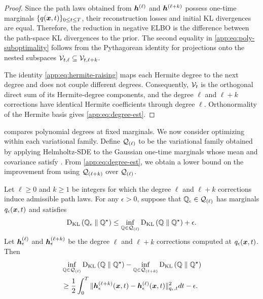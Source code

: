 \begin{proof}
Since the path laws obtained from $\boldsymbol{h}^{(\ell)}$ and $\boldsymbol{h}^{(\ell+k)}$ possess one-time marginals $\{q(\boldsymbol{x}, t)\}_{0 \leq t \leq T}$, their reconstruction losses and initial KL divergences are equal.
Therefore, the reduction in negative ELBO is the difference between the path-space KL divergences to the prior.
The second equality in \cref{app:eq:poly-suboptimality} follows from the Pythagorean identity for projections onto the nested subspaces $\mathcal{V}_{t,\ell}\subseteq\mathcal{V}_{t,\ell+k}$.

The identity \cref{app:eq:hermite-raising} maps each Hermite degree to the next degree and does not couple different degrees.
Consequently, $\mathcal{V}_t$ is the orthogonal direct sum of its Hermite-degree components, and the degree $\ell$ and $\ell+k$ corrections have identical Hermite coefficients through degree $\ell$.
Orthonormality of the Hermite basis gives \cref{app:eq:degree-est}.
\end{proof}

 compares polynomial degrees at fixed marginals. 
We now consider optimizing within each variational family.
Define $\mathcal{Q}_{(\ell)}$ to be the variational family obtained by applying Helmholtz-SDE to the Gaussian one-time marginals whose mean and covariance satisfy .
From \cref{app:eq:degree-est}, we obtain a lower bound on the improvement from using $\mathcal{Q}_{(\ell + k)}$ over $\mathcal{Q}_{(\ell)}$.
\begin{proposition}
\label{app:prop:error-nonlinear}
Let $\ell \geq 0$ and $k \geq 1$ be integers for which the degree $\ell$ and $\ell+k$ corrections induce admissible path laws.
For any $\epsilon>0$, suppose that $\mathbb{Q}_\epsilon\in\mathcal{Q}_{(\ell)}$ has marginals $q_\epsilon(\boldsymbol{x},t)$ and satisfies
\begin{equation*}
\textrm{D}_{\textrm{KL}}\left(\mathbb{Q}_\epsilon\;\|\;\mathbb{Q}^\star\right)\leq\inf_{\mathbb{Q}\in\mathcal{Q}_{(\ell)}}\textrm{D}_{\textrm{KL}}\left(\mathbb{Q}\;\|\;\mathbb{Q}^\star\right)+\epsilon.
\end{equation*}
Let $\boldsymbol{h}_\epsilon^{(\ell)}$ and $\boldsymbol{h}_\epsilon^{(\ell+k)}$ be the degree $\ell$ and $\ell + k$  corrections computed at $q_\epsilon(\boldsymbol{x},t)$.
Then
\begin{equation}\label{app:eq:optimality-bound}
\begin{aligned}
&\inf_{\mathbb{Q}\in\mathcal{Q}_{(\ell)}}\textrm{D}_{\textrm{KL}}\left(\mathbb{Q}\;\|\;\mathbb{Q}^\star\right)-\inf_{\mathbb{Q}\in\mathcal{Q}_{(\ell + k)}}\textrm{D}_{\textrm{KL}}\left(\mathbb{Q}\;\|\;\mathbb{Q}^\star\right)\\
&\geq\frac{1}{2}\int_0^T\|\boldsymbol{h}_\epsilon^{(\ell + k)}(\boldsymbol{x},t) - \boldsymbol{h}_\epsilon^{(\ell)}(\boldsymbol{x},t)\|_{q_\epsilon,t}^2dt-\epsilon.
\end{aligned}
\end{equation}
\end{proposition}

